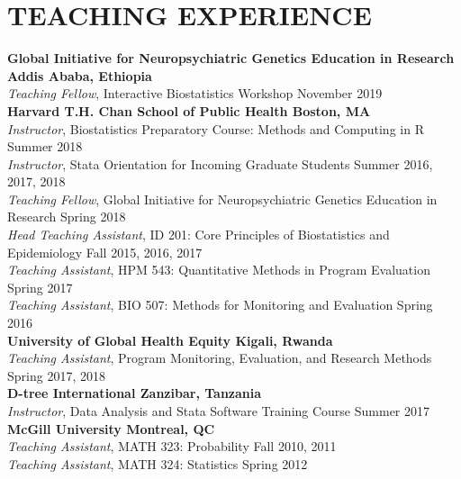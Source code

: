 \documentclass[12pt]{article}
\begin{document}
\section*{\textbf{{\large T}{EACHING} {\large E}{XPERIENCE}}}
\textbf{Global Initiative for Neuropsychiatric Genetics Education in Research \hfill \hfill Addis Ababa, Ethiopia} \\
\textit{Teaching Fellow}, Interactive Biostatistics Workshop \hfill \hfill November 2019 \\

\textbf{Harvard T.H. Chan School of Public Health \hfill \hfill Boston, MA} \\
\textit{Instructor}, Biostatistics Preparatory Course: Methods and Computing in R \hfill \hfill Summer 2018 \\
\textit{Instructor}, Stata Orientation for Incoming Graduate Students \hfill \hfill	Summer 2016, 2017, 2018\\
\textit{Teaching Fellow}, Global Initiative for Neuropsychiatric Genetics Education in Research \hfill \hfill Spring 2018 \\
\textit{Head Teaching Assistant}, ID 201: Core Principles of Biostatistics and Epidemiology \hfill \hfill Fall 2015, 2016, 2017 \\
\textit{Teaching Assistant}, HPM 543: Quantitative Methods in Program Evaluation \hfill \hfill Spring 2017 \\
\textit{Teaching Assistant}, BIO 507: Methods for Monitoring and Evaluation \hfill \hfill Spring 2016 \\

\textbf{University of Global Health Equity \hfill \hfill Kigali, Rwanda} \\
\textit{Teaching Assistant}, Program Monitoring, Evaluation, and Research Methods  \hfill \hfill Spring 2017, 2018 \\

\textbf{D-tree International \hfill \hfill Zanzibar, Tanzania}\\
\textit{Instructor}, Data Analysis and Stata Software Training Course \hfill \hfill Summer 2017  \\

\textbf{McGill University \hfill \hfill Montreal, QC}\\
\textit{Teaching Assistant}, MATH 323: Probability \hfill \hfill Fall 2010, 2011 \\
\textit{Teaching Assistant}, MATH 324: Statistics \hfill \hfill Spring 2012 
\end{document}
